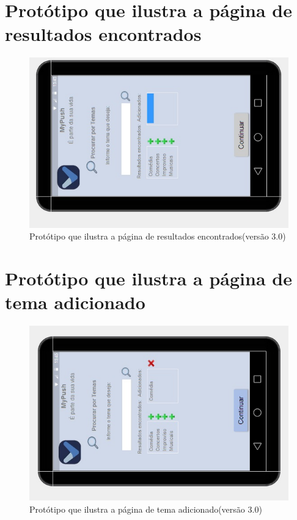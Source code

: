 \begin{apendicesenv}
    \pagebreak
      \section*{Protótipo que ilustra a página de resultados encontrados}

    \begin{figure}[!htbp]
      \centering
      \includegraphics[scale=0.9, angle=-90]{editaveis/figuras/prototipo_alta_fidelidade_v3/3_3}
      \caption{Protótipo que ilustra a página de resultados encontrados(versão 3.0)}
      \label{v3}
    \end{figure}
    
    \pagebreak
      \section*{Protótipo que ilustra a página de tema adicionado}

    \begin{figure}[!htbp]
      \centering
      \includegraphics[scale=0.9, angle=-90]{editaveis/figuras/prototipo_alta_fidelidade_v3/3_4}
      \caption{Protótipo que ilustra a página de tema adicionado(versão 3.0)}
      \label{v3}
    \end{figure}
    

\end{apendicesenv}
